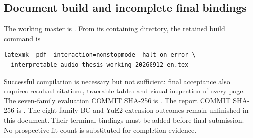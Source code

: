 \subsection{Document build and incomplete final bindings}
The working master is
.
From its containing directory, the retained build command is
\begin{verbatim}
latexmk -pdf -interaction=nonstopmode -halt-on-error \
  interpretable_audio_thesis_working_20260912_en.tex
\end{verbatim}
Successful compilation is necessary but not sufficient: final acceptance
also requires resolved citations, traceable tables and visual inspection of
every page. The seven-family evaluation COMMIT SHA-256 is
.
The report COMMIT SHA-256 is
.
The eight-family BC and YuE2 extension outcomes remain unfinished in this
document. Their terminal bindings must be added before final submission.
No prospective fit count is substituted for completion evidence.\par
\endgroup
